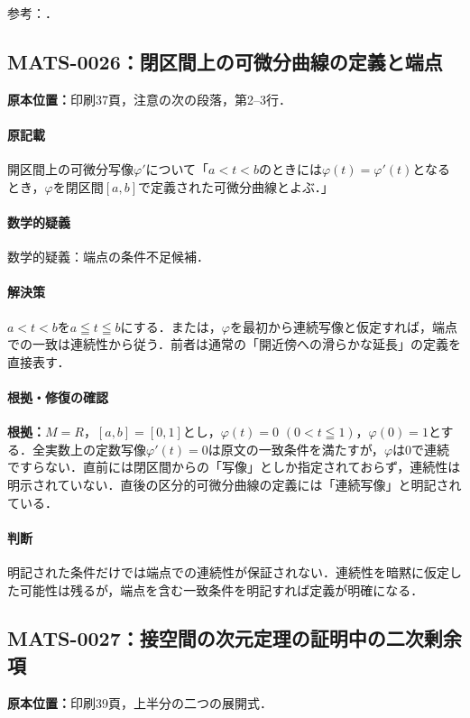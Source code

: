 \documentclass[a4paper,10pt]{ltjsarticle}
\begin{document}
\noindent 参考：\cite{paper2017}．

\subsection*{MATS-0026：閉区間上の可微分曲線の定義と端点}\label{math:MATS-0026}
\noindent\textbf{原本位置：}印刷37頁，注意の次の段落，第2--3行．

\paragraph{原記載}開区間上の可微分写像$\varphi'$について「$a<t<b$のときには$\varphi(t)=\varphi'(t)$となるとき，$\varphi$を閉区間$[a,b]$で定義された可微分曲線とよぶ．」

\paragraph{数学的疑義}数学的疑義：端点の条件不足候補．

\paragraph{解決策}$a<t<b$を$a\leqq t\leqq b$にする．または，$\varphi$を最初から連続写像と仮定すれば，端点での一致は連続性から従う．前者は通常の「開近傍への滑らかな延長」の定義を直接表す．

\paragraph{根拠・修復の確認}\textbf{根拠：}$M=R$，$[a,b]=[0,1]$とし，$\varphi(t)=0$ $(0<t\leqq1)$，$\varphi(0)=1$とする．全実数上の定数写像$\varphi'(t)=0$は原文の一致条件を満たすが，$\varphi$は$0$で連続ですらない．直前には閉区間からの「写像」としか指定されておらず，連続性は明示されていない．直後の区分的可微分曲線の定義には「連続写像」と明記されている．

\paragraph{判断}明記された条件だけでは端点での連続性が保証されない．連続性を暗黙に仮定した可能性は残るが，端点を含む一致条件を明記すれば定義が明確になる．


\subsection*{MATS-0027：接空間の次元定理の証明中の二次剰余項}\label{math:MATS-0027}
\noindent\textbf{原本位置：}印刷39頁，上半分の二つの展開式．
\end{document}
